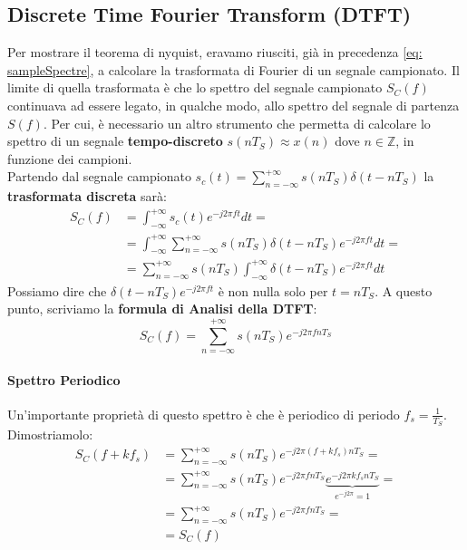 \newcommand{\DFT}{\xrightarrow{\text{DFT}}}
\newcommand{\IDFT}{\xrightarrow{\text{DFT}^{-1}}}
\newcommand{\DTFT}{\xrightarrow{\text{DTFT}}}

\subsection{Discrete Time Fourier Transform (DTFT)}
Per mostrare il teorema di nyquist, eravamo riusciti, già in precedenza \eqref{eq: sampleSpectre}, a calcolare la trasformata di Fourier
di un segnale campionato. Il limite di quella trasformata è che lo spettro del segnale campionato $S_C(f)$ continuava ad essere
legato, in qualche modo, allo spettro del segnale di partenza $S(f)$. Per cui, è necessario un altro strumento che permetta di
calcolare lo spettro di un segnale \textbf{tempo-discreto} $s(nT_S) \approx x(n)$ dove $n \in \mathbb{Z}$, in funzione dei campioni.\\
Partendo dal segnale campionato $s_c(t) = \sum_{n = -\infty}^{+\infty} s(nT_S)\delta(t - nT_S)$ la \textbf{trasformata discreta} sarà:
\begin{align*}
    S_C(f) &= \int_{-\infty}^{+\infty}s_c(t)e^{-j2\pi ft}dt =\\
           &= \int_{-\infty}^{+\infty} \sum_{n = -\infty}^{+\infty} s(nT_S)\delta(t - nT_S) e^{-j2\pi ft}dt=\\
           &= \sum_{n = -\infty}^{+\infty} s(nT_S) \int_{-\infty}^{+\infty} \delta(t - nT_S) e^{-j2\pi ft}dt
\end{align*}
Possiamo dire che $\delta(t - nT_S) e^{-j2\pi ft}$ è non nulla solo per $t = nT_S$.
A questo punto, scriviamo la \textbf{formula di Analisi della DTFT}:
\begin{equation}
    S_C(f) = \sum_{n = -\infty}^{+\infty} s(nT_S) e^{-j2\pi fnT_S}
\end{equation}
\paragraph{Spettro Periodico}Un'importante proprietà di questo spettro è che è periodico di periodo $f_s = \frac{1}{T_S}$. Dimostriamolo:
\begin{align*}
    S_C(f + kf_s) &= \sum_{n = -\infty}^{+\infty} s(nT_S) e^{-j2\pi (f + kf_s)nT_S} = \\
                  &= \sum_{n = -\infty}^{+\infty} s(nT_S) e^{-j2\pi fnT_S}  \underbrace{e^{-j2\pi kf_s nT_S}}_{e^{-j2\pi} = 1} =\\
                  &= \sum_{n = -\infty}^{+\infty} s(nT_S) e^{-j2\pi fnT_S} =\\
                  &= S_C(f)
\end{align*}

